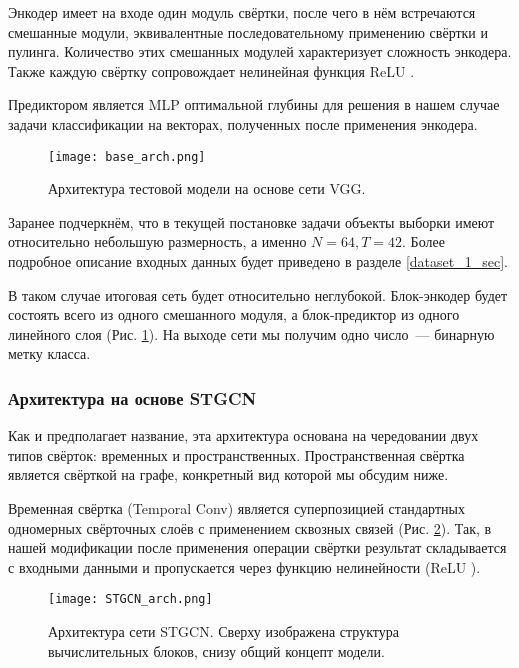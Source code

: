 \documentclass[12pt]{article}
\begin{document}
Энкодер имеет на входе один модуль свёртки, после чего в нём встречаются смешанные модули, эквивалентные последовательному применению свёртки и пулинга. Количество этих смешанных модулей характеризует сложность энкодера. Также каждую свёртку сопровождает нелинейная функция ReLU \cite{krizhevsky2012imagenet}.

Предиктором является MLP оптимальной глубины для решения в нашем случае задачи классификации на векторах, полученных после применения энкодера.

\begin{figure}[ht]
        \centering
        \texttt{[image: base\_arch.png]}
        \caption{Архитектура тестовой модели на основе сети VGG.}
        \label{base_arch}
    \end{figure}
    
Заранее подчеркнём, что в текущей постановке задачи объекты выборки имеют относительно небольшую размерность, а именно $N=64, T=42$. Более подробное описание входных данных будет приведено в разделе \ref{dataset_1_sec}. 

В таком случае итоговая сеть будет относительно неглубокой. Блок-энкодер будет состоять всего из одного смешанного модуля, а блок-предиктор из одного линейного слоя (Рис. \ref{base_arch}). На выходе сети мы получим одно число~--- бинарную метку класса.

\subsubsection{Архитектура на основе STGCN}

Как и предполагает название, эта архитектура основана на чередовании двух типов свёрток: временных и пространственных. Пространственная свёртка является свёрткой на графе, конкретный вид которой мы обсудим ниже. 

Временная свёртка (Temporal Conv) является суперпозицией стандартных одномерных свёрточных слоёв с применением сквозных связей (Рис. \ref{stgcn}). Так, в нашей модификации после применения операции свёртки результат складывается с входными данными и пропускается через функцию нелинейности (ReLU \cite{krizhevsky2012imagenet}).

\begin{figure}[ht]
        \centering
        \texttt{[image: STGCN\_arch.png]}
        \caption{Архитектура сети STGCN. Сверху изображена структура вычислительных блоков, снизу общий концепт модели.}
        \label{stgcn}
    \end{figure}
    
\end{document}
